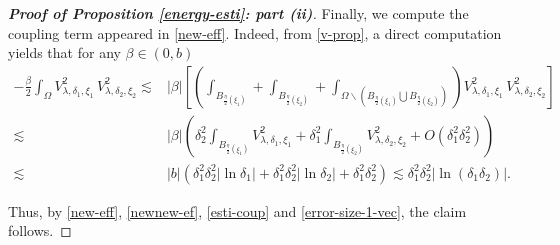 \documentclass[a4paper,reqno,11pt,oneside]{amsart}
\numberwithin{equation}{section}
\begin{document}
\begin{proof}[\textbf{Proof of Proposition \eqref{energy-esti}: part (ii)}]
Finally, we compute the coupling term appeared in \eqref{new-eff}. Indeed, from \eqref{v-prop}, a direct computation yields that for any $\beta\in(0,b)$
\begin{align}\label{esti-coup}
    -\frac{\beta}{2}\displaystyle\int_{\Omega}V_{\lambda,\delta_1,\xi_1}^2\,V_{\lambda,\delta_2,\xi_2}^2\lesssim&|\beta|\left[\left(\displaystyle\int_{B_{\frac{\eta}{2}(\xi_1)}}+\displaystyle\int_{B_{\frac{\eta}{2}(\xi_2)}}+\displaystyle\int_{\Omega\backslash(B_{\frac{\eta}{2}(\xi_1)}\bigcup B_{\frac{\eta}{2}(\xi_2)})}\right)V_{\lambda,\delta_1,\xi_1}^{2}\,V_{\lambda,\delta_2,\xi_2}^{2}\right]\nonumber\\
    \lesssim&|\beta|\left(\delta_2^2\displaystyle\int_{B_{\frac{\eta}{2}(\xi_1)}}V_{\lambda,\delta_1,\xi_1}^{2}+\delta_1^2\displaystyle\int_{B_{\frac{\eta}{2}(\xi_2)}}V_{\lambda,\delta_2,\xi_2}^{2}+O\left(\delta_1^2\delta_2^2\right)\right)\nonumber\\
    \lesssim&|b|\left(\delta_1^2\delta_2^2|\ln{\delta_1}|+\delta_1^2\delta_2^2|\ln{\delta_2}|+\delta_1^2\delta_2^2\right)\lesssim \delta_1^2\delta_2^2|\ln{(\delta_1\delta_2)}|.
\end{align}

Thus, by \eqref{new-eff}, \eqref{newnew-ef}, \eqref{esti-coup} and \eqref{error-size-1-vec}, the claim follows.
 \end{proof}
\end{document}
